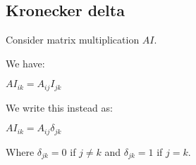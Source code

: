 
\subsection{Kronecker delta}

Consider matrix multiplication \(AI\).

We have:

\(AI_{ik}=A_{ij}I_{jk}\)

We write this instead as:

\(AI_{ik}=A_{ij}\delta_{jk}\)

Where \(\delta_{jk}=0\) if \(j\ne k\) and \(\delta_{jk}=1\) if \(j=k\).

